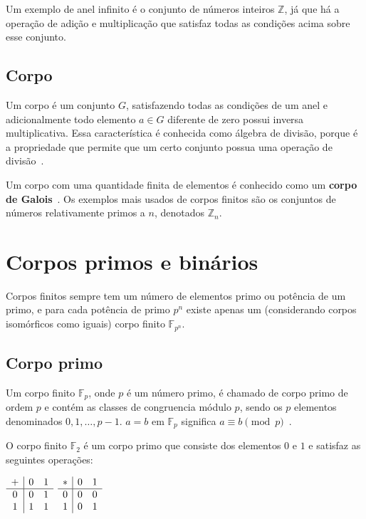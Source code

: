 \documentclass[12pt]{article}
\begin{document}
Um exemplo de anel infinito é o conjunto de números inteiros $\mathbb{Z}$, já
que há a operação de adição e multiplicação que satisfaz todas as condições
acima sobre esse conjunto.

\subsection{Corpo}

Um corpo é um conjunto $G$, satisfazendo todas as condições de um anel e
adicionalmente todo elemento $a \in G$ diferente de zero possui inversa
multiplicativa. Essa característica é conhecida como álgebra de divisão, porque
é a propriedade que permite que um certo conjunto possua uma operação de
divisão~\cite{weisstein:1999:fieldaxioms}.

Um corpo com uma quantidade finita de elementos é conhecido como um
\textbf{corpo de Galois}~\cite{weisstein:1999:finitefield}. Os exemplos mais usados de corpos finitos são os
conjuntos de números relativamente primos a $n$, denotados $\mathbb{Z}_{n}$.

\section{Corpos primos e binários}

Corpos finitos sempre tem um número de elementos primo ou potência de um primo,
e para cada potência de primo $p^{n}$ existe apenas um (considerando corpos
isomórficos como iguais) corpo finito $\mathbb{F}_{p^{n}}$.

\subsection{Corpo primo}

Um corpo finito $\mathbb{F}_{p}$, onde $p$ é um número primo, é chamado de
corpo primo de ordem $p$ e contém as classes de congruencia módulo $p$, sendo
os $p$ elementos denominados $0, 1, \ldots, p-1$. $a = b$ em $\mathbb{F}_{p}$
significa $a \equiv b \pmod{p}$~\cite{weisstein:1999:finitefield}.

O corpo finito $\mathbb{F}_{2}$ é um corpo primo que consiste dos elementos $0$
e $1$ e satisfaz as seguintes operações:

\begin{center}
    $\begin{array}{ c | c c }
        + & 0 & 1 \\ \hline
        0 & 0 & 1 \\
        1 & 1 & 1
    \end{array}$
    \hspace{4em}
    $\begin{array}{ c | c c }
        * & 0 & 1 \\ \hline
        0 & 0 & 0 \\
        1 & 0 & 1
    \end{array}$
\end{center}
\end{document}
